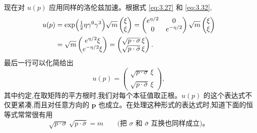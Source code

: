 现在对 $u(p)$ 应用同样的洛伦兹加速。根据式 \eqref{eq:3.27} 和 \eqref{eq:3.32},
\begin{align}
  u(p) &= \exp\Bigl( \tfrac{1}{2}\eta\gamma^0\gamma^3 \Bigr)
    \sqrt{m}\begin{pmatrix}\xi\\ \xi\end{pmatrix}
  = \begin{pmatrix}
      e^{\eta/2} & 0\\
      0 & e^{-\eta/2}
    \end{pmatrix}
    \sqrt{m}\begin{pmatrix}\xi\\ \xi\end{pmatrix}\\
  &= \sqrt{m}
    \begin{pmatrix}
      e^{\eta/2}\xi\\
      e^{-\eta/2}\xi
    \end{pmatrix}
  = \begin{pmatrix}
      \sqrt{p\cdot\sigma}\,\xi\\
      \sqrt{p\cdot\bar{\sigma}}\,\xi
    \end{pmatrix}.
  \label{eq:3.51}
\end{align}
最后一行可以化简给出
\begin{equation}
  u(p) = \begin{pmatrix}
    \sqrt{p\cdot\sigma}\,\xi\\
    \sqrt{p\cdot\bar{\sigma}}\,\xi
  \end{pmatrix},
  \label{eq:3.52}
\end{equation}
其中约定,在取矩阵的平方根时,我们对每个本征值取正根。$u(p)$ 的这个表达式不仅更紧凑,而且对任意方向的 $\mathbf{p}$ 也成立。在处理这种形式的表达式时,知道下面的恒等式常常很有用
\begin{equation}
  \sqrt{p\cdot\sigma}\,\sqrt{p\cdot\bar{\sigma}} = m
  \qquad\text{(把 $\sigma$ 和 $\bar{\sigma}$ 互换也同样成立)。}
  \label{eq:3.53}
\end{equation}

